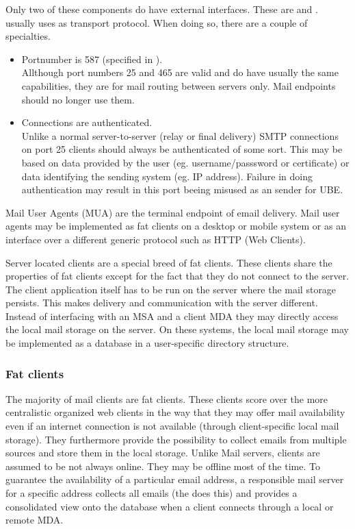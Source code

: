 Only two of these components do have external interfaces. These are  and .  usually uses  as transport protocol. When doing so, there are a couple of specialties. 
\begin{itemize}
	\item Portnumber is 587 (specified in \cite{RFC4409}).\\
	Allthough port numbers 25 and 465 are valid and do have usually the same capabilities, they are for mail routing between servers only. Mail endpoints should no longer use them.
	\item Connections are authenticated.\\
	Unlike a normal server-to-server (relay or final delivery) SMTP connections on port 25 clients should always be authenticated of some sort. This may be based on data provided by the user (eg. username/passsword or certificate) or data identifying the sending system (eg. IP address)\cite{RFC4409}. Failure in doing authentication may result in this port beeing misused as an sender for UBE.
\end{itemize}

Mail User Agents (MUA) are the terminal endpoint of email delivery. Mail user agents may be implemented as fat clients on a desktop or mobile system or as an interface over a different generic protocol such as HTTP (Web Clients). 

Server located clients are a special breed of fat clients. These clients share the properties of fat clients except for the fact that they do not connect to the server. The client application itself has to be run on the server where the mail storage persists. This makes delivery and communication with the server different. Instead of interfacing with an MSA and a client MDA they may directly access the local mail storage on the server. On these systems, the local mail storage may be implemented as a database in a user-specific directory structure.

\subsubsection{Fat clients}
The majority of mail clients are fat clients. These clients score over the more centralistic organized web clients in the way that they may offer mail availability even if an internet connection is not available (through client-specific local mail storage). They furthermore provide the possibility to collect emails from multiple sources and store them in the local storage. Unlike Mail servers, clients are assumed to be not always online. They may be offline most of the time. To guarantee the availability of a particular email address, a responsible mail server for a specific address collects all emails (the  does this) and provides a consolidated view onto the database when a client connects through a local or remote MDA.

